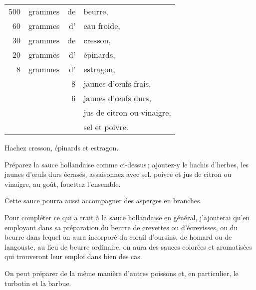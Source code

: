 \footnotesize
\begin{longtable}{rrrp{16em}}
    500 & grammes & de & beurre,                                                                          \\
     60 & grammes & d' & eau froide,                                                                      \\
     30 & grammes & de & cresson,                                                                         \\
     20 & grammes & d' & épinards,                                                                        \\
      8 & grammes & d' & estragon,                                                                        \\
        &         &  8 & jaunes d'œufs frais,                                                             \\
        &         &  6 & jaunes d'œufs durs,                                                              \\
        &         &    & jus de citron ou vinaigre,                                                       \\
        &         &    & sel et poivre.                                                                   \\
\end{longtable}
\normalsize

Hachez cresson, épinards et estragon.

Préparez la sauce hollandaise comme ci-dessus ; ajoutez-y le hachis d'herbes,
les jaunes d'œufs durs écrasés, assaisonnez avec sel. poivre et jus de citron
ou vinaigre, au goût, fouettez l'ensemble.

\sk

Cette sauce pourra aussi accompagner des asperges en branches.

\sk

Pour compléter ce qui a trait à la sauce hollandaise en général, j'ajouterai
qu'en employant dans sa préparation du beurre de crevettes ou d'écrevisses, ou
du beurre dans lequel on aura incorporé du corail d'oursins, de homard ou de
langouste, au lieu de beurre ordinaire, on aura des sauces colorées et
aromatisées qui trouveront leur emploi dans bien des cas.

\sk

On peut préparer de la même manière d'autres poissons et, en particulier, le
turbotin et la barbue.

